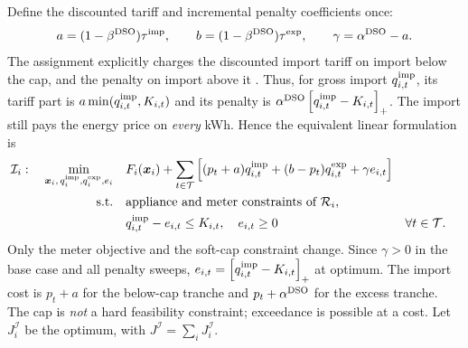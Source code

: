 \documentclass[10pt,a4paper]{article}
\newcommand{\pos}[1]{\left[#1\right]_+}
\newcommand{\Rmod}{\mathcal R}
\newcommand{\Imod}{\mathcal I}
\begin{document}
Define the discounted tariff and incremental penalty coefficients once:
\begin{equation}
a=(1-\beta^{\rm DSO})\tau^{\rm imp},\qquad
b=(1-\beta^{\rm DSO})\tau^{\rm exp},\qquad
\gamma=\alpha^{\rm DSO}-a .
\label{eq:tariffs}
\end{equation}
The assignment explicitly charges the discounted import tariff on import below the cap, and the penalty on import above it \cite[pp.~4--5]{a2}. Thus, for gross import $q^{\rm imp}_{i,t}$, its tariff part is $a\min(q^{\rm imp}_{i,t},K_{i,t})$ and its penalty is $\alpha^{\rm DSO}\pos{q^{\rm imp}_{i,t}-K_{i,t}}$. The import still pays the energy price on \emph{every} kWh. Hence the equivalent linear formulation is
\begin{subequations}\label{eq:I}
\begin{align}
\Imod_i:\quad
\min_{\bm x_i,\,q^{\rm imp}_i,q^{\rm exp}_i,e_i}\quad
 &F_i(\bm x_i)+\sum_{t\in\mathcal T}\left[
 (p_t+a)q_{i,t}^{\rm imp}+(b-p_t)q_{i,t}^{\rm exp}
 +\gamma e_{i,t}\right]\\
\text{s.t.}\quad &\text{appliance and meter constraints of }\Rmod_i,\nonumber\\
 &q_{i,t}^{\rm imp}-e_{i,t}\le K_{i,t},\quad e_{i,t}\geq0
      &&\forall t\in\mathcal T .
\end{align}
\end{subequations}
Only the meter objective and the soft-cap constraint change. Since $\gamma>0$ in the base case and all penalty sweeps, $e_{i,t}=\pos{q^{\rm imp}_{i,t}-K_{i,t}}$ at optimum. The import cost is $p_t+a$ for the below-cap tranche and $p_t+\alpha^{\rm DSO}$ for the excess tranche. The cap is \emph{not} a hard feasibility constraint; exceedance is possible at a cost. Let $J_i^{\Imod}$ be the optimum, with $J^{\Imod}=\sum_i J_i^{\Imod}$.
\end{document}
